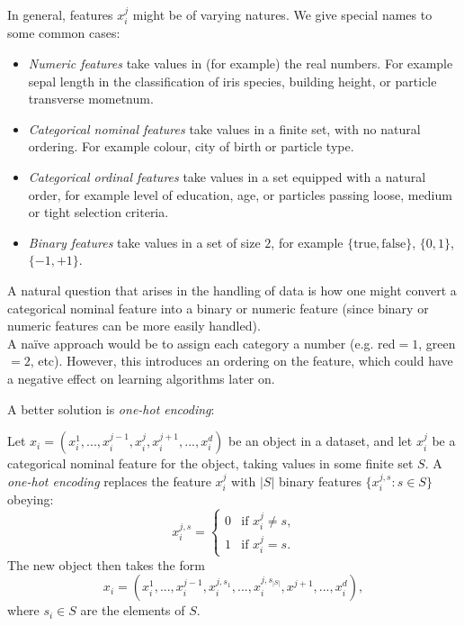 \begin{framedef}
In general, features $x_i^j$ might be of varying natures. We give special names to some common cases:
\begin{itemize}
\item \textit{Numeric features} take values in (for example) the real numbers. For example sepal length in the classification of iris species, building height, or particle transverse mometnum.
\item \textit{Categorical nominal features} take values in a finite set, with no natural ordering. For example colour, city of birth or particle type.
\item \textit{Categorical ordinal features} take values in a set equipped with a natural order, for example level of education, age, or particles passing loose, medium or tight selection criteria.
\item \textit{Binary features} take values in a set of size $2$, for example $\{\text{true}, \text{false}\}$, $\{0,1\}$, $\{-1,+1\}$. 
\end{itemize}
\end{framedef}

A natural question that arises in the handling of data is how one might convert a categorical nominal feature into a binary or numeric feature (since binary or numeric features can be more easily handled).\\

A na\"{i}ve approach would be to assign each category a number (e.g. red$=1$, green$=2$, etc). However, this introduces an ordering on the feature, which could have a negative effect on learning algorithms later on. 


\newpage
A better solution is \textit{one-hot encoding}:

\begin{framedef}
Let $x_i = (x_i^1,...,x_i^{j-1},x_i^j,x_i^{j+1}, ..., x_i^d)$ be an object in a dataset, and let $x_i^j$ be a categorical nominal feature for the object, taking values in some finite set $S$. A \textit{one-hot encoding} replaces the feature $x_i^j$ with $|S|$ binary features $\{x_i^{j,s} : s \in S\}$ obeying:
\begin{equation*}
x_i^{j,s} = \begin{cases} 0 & \text{if $x_i^j \neq s$,}\\ 1 & \text{if $x_i^j = s$.} \end{cases}
\end{equation*}
The new object then takes the form 
\begin{equation*}
x_i = (x_i^1,...,x_i^{j-1}, x_i^{j,s_1},...,x_i^{j, s_{|S|}}, x^{j+1},...,x_i^d),
\end{equation*}
where $s_i \in S$ are the elements of $S$.
\end{framedef}

